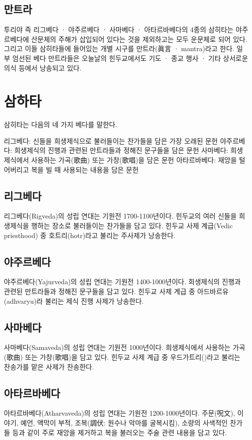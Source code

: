 \documentclass[12pt, a4paper, oneside]{book}
\let\stdsection\section
\renewcommand\section{\newpage\stdsection}
\begin{document}
\subsection{만트라}
투리야 즉 리그베다 · 야주르베다 · 사마베다 · 아타르바베다의 4종의 삼히타는 야주르베다에 산문체의 주해가 삽입되어 있다는 것을 제외하고는 모두 운문체로 되어 있다. 그리고 이들 삼히타들에 들어있는 개별 시구를 만트라(眞言 · mantra)라고 한다. 일부 엄선된 베다 만트라들은 오늘날의 힌두교에서도 기도 · 종교 행사 · 기타 상서로운 의식 등에서 낭송되고 있다.



\section{삼하타}


삼히타는 다음의 네 가지 베다를 말한다.

리그베다: 신들을 희생제식으로 불러들이는 찬가들을 담은 가장 오래된 문헌
야주르베다: 희생제식의 진행과 관련된 만트라들과 정해진 문구들을 담은 문헌
사마베다: 희생제식에서 사용하는 가곡(歌曲) 또는 가창(歌唱)을 담은 문헌
아타르바베다: 재앙을 털어버리고 복을 빌 때 사용되는 내용을 담은 문헌

\subsection{리그베다}
리그베다(Rigveda)의 성립 연대는 기원전 1700-1100년이다. 
힌두교의 여러 신들을 희생제식을 행하는 장소로 불러들이는 찬가들을 담고 있다.
힌두교 사제 계급(Vedic priesthood) 중 호트리(hotr)라고 불리는 주사제가 낭송한다.

\subsection{야주르베다}
야주르베다(Yajurveda)의 성립 연대는 기원전 1400-1000년이다.
희생제식의 진행과 관련된 만트라들과 정해진 문구들을 담고 있다.
힌두교 사제 계급 중 아드바르유(adhvaryu)라 불리는 제식 진행 사제가 낭송한다.

\subsection{사마베다}
사마베다(Samaveda)의 성립 연대는 기원전 1000년이다.
희생제식에서 사용하는 가곡(歌曲) 또는 가창(歌唱)을 담고 있다.
힌두교 사제 계급 중 우드가트리()라고 불리는 찬송가를 맡은 사제가 찬송한다.

\subsection{아타르바베다}
아타르바베다(Atharvaveda)의 성립 연대는 기원전 1200-1000년이다.
주문(呪文), 이야기, 예언, 액막이 부적, 조복(調伏: 원수나 악마를 굴복시킴), 소량의 사색적인 찬가들 등과 같이 주로 재앙을 제거하고 복을 불러오는 주술 관련 내용을 담고 있다.
\end{document}
